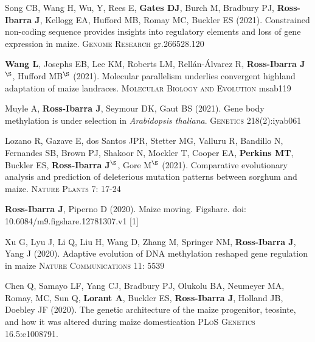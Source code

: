 \documentclass[letterpaper,10pt]{article}
\begin{document}
\begin{etaremune}
\item Song CB, Wang H, Wu, Y, Rees E, \textbf{Gates DJ}, Burch M,  Bradbury PJ, \textbf{Ross-Ibarra J}, Kellogg EA, Hufford MB, Romay MC, Buckler ES (2021).  Constrained non-coding sequence provides insights into regulatory elements and loss of gene expression in maize. \textsc{Genome Research} gr.266528.120 %

\item \textbf{Wang L}, Josephs EB, Lee KM, Roberts LM, Rell\'{a}n-\'{A}lvarez R, \textbf{Ross-Ibarra J}$^\S$, Hufford MB$^\S$ (2021). Molecular parallelism underlies convergent highland adaptation of maize landraces. \textsc{Molecular Biology and Evolution} msab119 %

\item Muyle A, \textbf{Ross-Ibarra J}, Seymour DK, Gaut BS (2021). Gene body methylation is under selection in \textit{Arabidopsis thaliana}. \textsc{Genetics} 218(2):iyab061 %

\item Lozano R, Gazave E, dos Santos JPR, Stetter MG, Valluru R, Bandillo N, Fernandes SB, Brown PJ, Shakoor N, Mockler T, Cooper EA, \textbf{Perkins MT}, Buckler ES, \textbf{Ross-Ibarra J}$^\S$, Gore M$^\S$ (2021). Comparative evolutionary analysis and prediction of deleterious mutation patterns between sorghum and maize. \textsc{Nature Plants} 7: 17-24  %

\item \textbf{Ross-Ibarra J}, Piperno D (2020). Maize moving. Figshare. doi: 10.6084/m9.figshare.12781307.v1 [1] 


\item Xu G, Lyu J, Li Q, Liu H, Wang D, Zhang M, Springer NM, \textbf{Ross-Ibarra J}, Yang J (2020). Adaptive evolution of DNA methylation reshaped gene regulation in maize \textsc{Nature Communications} 11: 5539

\item Chen Q, Samayo LF, Yang CJ, Bradbury PJ, Olukolu BA, Neumeyer MA, Romay, MC, Sun Q, \textbf{Lorant A}, Buckler ES, \textbf{Ross-Ibarra J}, Holland JB, Doebley JF (2020).
The genetic architecture of the maize progenitor, teosinte, and how it was altered during maize domestication \textsc{PLoS Genetics} 16.5:e1008791.


\end{etaremune}
\end{document}
